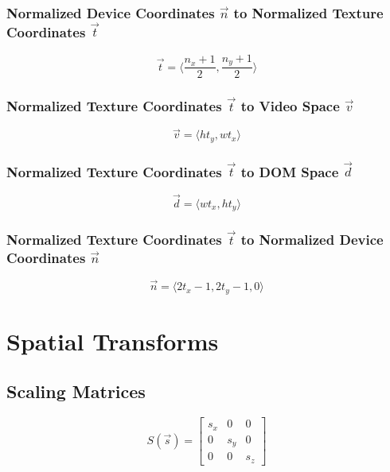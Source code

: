 \subsubsection{Normalized Device Coordinates $\vec{n}$ to Normalized Texture Coordinates $\vec{t}$}
\begin{equation}
    \vec{t} = \langle \frac{n_x + 1}{2}, \frac{n_y + 1}{2} \rangle
\end{equation}

\subsubsection{Normalized Texture Coordinates $\vec{t}$ to Video Space $\vec{v}$}
\begin{equation}
    \vec{v} = \langle ht_y, wt_x \rangle
\end{equation}

\subsubsection{Normalized Texture Coordinates $\vec{t}$ to DOM Space $\vec{d}$}
\begin{equation}
    \vec{d} = \langle wt_x, ht_y \rangle
\end{equation}

\subsubsection{Normalized Texture Coordinates $\vec{t}$ to Normalized Device Coordinates $\vec{n}$}
\begin{equation}
    \vec{n} = \langle 2t_x - 1, 2t_y - 1, 0 \rangle
\end{equation}


\section{Spatial Transforms}

\subsection{Scaling Matrices}
\begin{equation}
S(\vec{s}) =
\begin{bmatrix}
    s_{x} & 0 & 0 \\
    0 & s_{y} & 0 \\
    0 & 0 & s_{z}
\end{bmatrix}
\end{equation}

